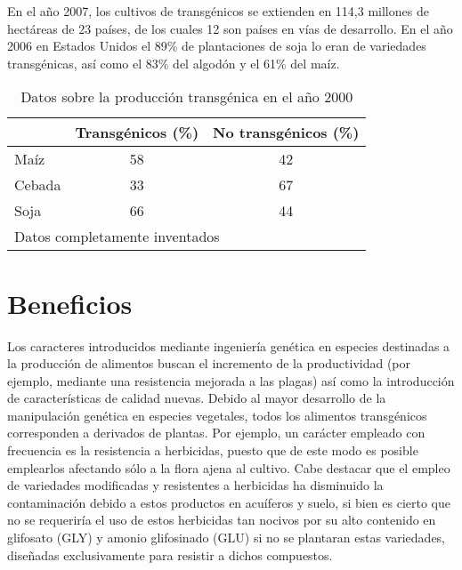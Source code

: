 \documentclass[11pt,a4paper]{article}
\begin{document}
En el año 2007, los cultivos de transgénicos se extienden en 114,3 millones de hectáreas de 23 países, de los cuales 12 son países en vías de desarrollo.\cite{enrique}
 En el año 2006 en Estados Unidos el 89\% de plantaciones de soja lo eran de variedades transgénicas, así como el 83\% del algodón y el 61\% del maíz.\cite{chia}



\begin{table}
\centering
\begin{tabular}{|l|c|c|}
\hline
     &  Transgénicos (\%)  & No transgénicos (\%)  \\
\hline\hline
Maíz  &    58  &   42 \\
\hline
Cebada &   33   &  67   \\
\hline
Soja   &  66   & 44 \\
\hline
\multicolumn{3}{l}{\footnotesize Datos completamente inventados}
\end{tabular}
\caption{Datos sobre la producción transgénica en el año 2000}
\label{tabla.transg3}
\end{table}




\section{Beneficios}\label{seccion.beneficios}



Los caracteres introducidos mediante ingeniería genética en especies destinadas a la producción de alimentos buscan el incremento de la productividad (por ejemplo, mediante una resistencia mejorada a las plagas) así como la introducción de características de calidad nuevas. Debido al mayor desarrollo de la manipulación genética en especies vegetales, todos los alimentos transgénicos corresponden a derivados de plantas. Por ejemplo, un carácter empleado con frecuencia es la resistencia a herbicidas, puesto que de este modo es posible emplearlos afectando sólo a la flora ajena al cultivo. Cabe destacar que el empleo de variedades modificadas y resistentes a herbicidas ha disminuido la contaminación debido a estos productos en acuíferos y suelo,\cite{kisko}
si bien es cierto que no se requeriría el uso de estos herbicidas tan nocivos por su alto contenido en glifosato (GLY) y amonio glifosinado (GLU) \cite{amrouche} 
si no se plantaran estas variedades, diseñadas exclusivamente para resistir a dichos compuestos. \cite{frank}
\end{document}
